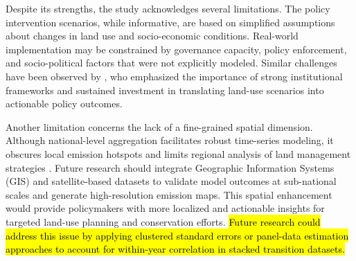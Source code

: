 \documentclass[10pt,letterpaper]{article}
\begin{document}
%

Despite its strengths, the study acknowledges several limitations. The policy intervention scenarios, while informative, are based on simplified assumptions about changes in land use and socio-economic conditions. Real-world implementation may be constrained by governance capacity, policy enforcement, and socio-political factors that were not explicitly modeled. Similar challenges have been observed by \cite{hauck2019combining}, who emphasized the importance of strong institutional frameworks and sustained investment in translating land-use scenarios into actionable policy outcomes.

Another limitation concerns the lack of a fine-grained spatial dimension. Although national-level aggregation facilitates robust time-series modeling, it obscures local emission hotspots and limits regional analysis of land management strategies \cite{regional_ghg_2025}. Future research should integrate Geographic Information Systems (GIS) and satellite-based datasets to validate model outcomes at sub-national scales and generate high-resolution emission maps. This spatial enhancement would provide policymakers with more localized and actionable insights for targeted land-use planning and conservation efforts. \hl{Future research could address this issue by applying clustered standard errors or panel-data estimation approaches to account for within-year correlation in stacked transition datasets.}
\end{document}
